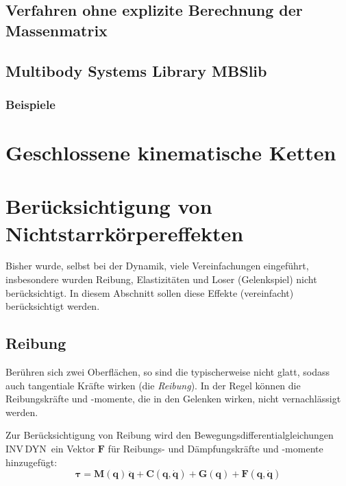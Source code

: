 \documentclass[a4paper, 11pt, accentcolor = tud3b]{tudreport}
\newcommand{\mat}[1]{\boldsymbol{#1}}
\renewcommand{\vec}[1]{\boldsymbol{\mathbf{#1}}}
\newcommand{\INVDYN}{INV\,DYN~}
\begin{document}
			\subsection{Verfahren ohne explizite Berechnung der Massenmatrix} %

			\subsection{Multibody Systems Library MBSlib} %

				\subsubsection{Beispiele} %

		\section{Geschlossene kinematische Ketten} %

		\section{Berücksichtigung von Nichtstarrkörpereffekten}
			Bisher wurde, selbst bei der Dynamik, viele Vereinfachungen eingeführt, insbesondere wurden Reibung, Elastizitäten und Loser (Gelenkspiel) nicht berücksichtigt. In diesem Abschnitt sollen diese Effekte (vereinfacht) berücksichtigt werden.

			\subsection{Reibung}
				Berühren sich zwei Oberflächen, so sind die typischerweise nicht glatt, sodass auch tangentiale Kräfte wirken (die \emph{Reibung}). In der Regel können die Reibungskräfte und -momente, die in den Gelenken wirken, nicht vernachlässigt werden.
				
				Zur Berücksichtigung von Reibung wird den Bewegungsdifferentialgleichungen \INVDYN ein Vektor \( \vec{F} \) für Reibungs- und Dämpfungskräfte und -momente hinzugefügt:
				\begin{equation*}
					\vec{\tau} = \mat{M}(\vec{q}\!)\, \ddot{\vec{q}} + \vec{C}(\vec{q}, \dot{\vec{q}}\!) + \vec{G}(\vec{q}\!) + \vec{F}(\vec{q}, \dot{\vec{q}}\!)
				\end{equation*}
				
\end{document}
